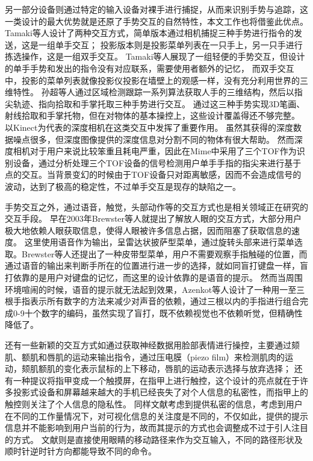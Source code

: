另一部分设备则通过特定的输入设备对裸手进行捕捉，从而来识别手势与追踪，这一类设计的最大优势就是还原了手势交互的自然特性，本文工作也将借鉴此优点。
Tamaki等人设计了两种交互方式，简单版本通过相机捕捉三种手势进行指令的发送，这是一组单手交互；
投影版本则是投影菜单列表在一只手上，另一只手进行拣选操作，这是一组双手交互。
Tamaki等人展现了一组轻便的手势交互，但设计的单手手势和发出的指令没有对应联系，需要使用者额外的记忆，
而双手交互中，投影的菜单列表就像投影仪投影在墙壁上的观感一样，没有充分利用世界的三维特性。
孙超等人通过区域检测跟踪一系列算法获取人手的三维结构，然后以指尖轨迹、指向拾取和手掌托取三种手势进行交互。
通过这三种手势实现3D笔画、射线拾取和手掌托物，但在对物体的基本操控上，这些设计覆盖得还不够完整。
以Kinect为代表的深度相机在这类交互中发挥了重要作用。
虽然其获得的深度数据噪点很多，但深度图像提供的深度信息对分割不同的物体有很大帮助。
然而深度相机对于用户来说比较笨重且耗电严重，因此在Mime中采用了三个TOF作为识别设备，通过分析处理三个TOF设备的信号检测用户单手手指的指尖来进行基于点的交互。当背景变幻的时候由于TOF设备只对距离敏感，因而不会造成信号的波动，达到了极高的稳定性，不过单手交互是现存的缺陷之一。

手势交互之外，通过语音，触觉，头部动作等的交互方式也是相关领域正在研究的交互手段。
早在2003年Brewster等人就提出了解放人眼的交互方式，大部分用户极大地依赖人眼获取信息，使得人眼被许多信息占据，因而阻塞了获取信息的速度。
这里使用语音作为输出，呈雷达状披萨型菜单，通过旋转头部来进行菜单选取。Brewster等人还提出了一种皮带型菜单，用户不需要观察手指触碰的位置，而通过语音的输出来判断手所在的位置进行进一步的选择，就如同盲打键盘一样，盲打依靠的是用户对键盘的记忆，而这里的设计依靠的是语音的提示。
然而当周围环境喧闹的时候，语音的提示就无法起到效果，Azenkot等人设计了一种用一至三根手指表示所有数字的方法来减少对声音的依赖，通过三根以内的手指进行组合完成0-9十个数字的编码，虽然实现了盲打，既不依赖视觉也不依赖听觉，但精确性降低了。

还有一些新颖的交互方式如通过获取神经数据用脸部表情进行操控，主要通过颏肌、额肌和唇肌的运动来输出指令，通过压电膜（piezo film）来检测肌肉的运动，颏肌额肌的变化表示鼠标的上下移动，唇肌的运动表示选择与放弃选择；
还有一种提议将指甲变成一个触摸屏，在指甲上进行触控，这个设计的亮点就在于许多投影式设备和屏幕越来越大的手机已经丧失了对个人信息的私密性，而指甲上的触控则关注了个人信息的隐私性。
同样文献\cite{Eye-q}考虑到提供私密的信息，考虑到用户在不同的工作量情况下，对可视化信息的关注度是不同的，不仅如此，提供的提示信息并不能影响到用户当前的行为，故而其提示的方式也会调整成不过于引人注目的方式。
文献\cite{vidal2013pursuits}则是直接使用眼睛的移动路径来作为交互输入，不同的路径形状及顺时针逆时针方向都能导致不同的命令。

